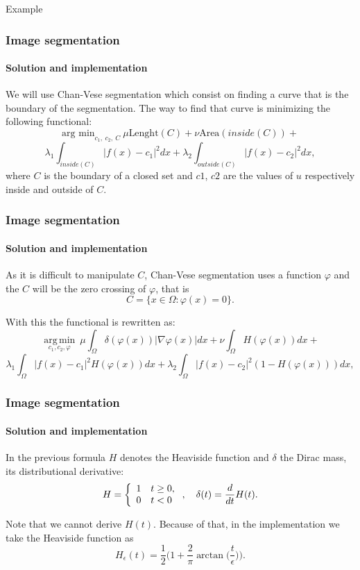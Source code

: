 \documentclass[11pt]{beamer}
\DeclareMathOperator*{\argmin}{\mathrm{arg\, min}}
\begin{document}
\begin{frame}
\begin{exampleblock}{Example}
\begin{figure}
\begin{subfigure}[b]{0.4\textwidth}
    \end{subfigure}

\end{figure}
\end{exampleblock}
\end{frame}

\begin{frame}
\frametitle{Image segmentation}
\framesubtitle{Solution and implementation}

We will use Chan-Vese segmentation which consist on finding a curve that is the boundary of the segmentation. The way to find that curve is minimizing the following functional:
$$\text{arg min}_{c_1,\ c_2,\ C }\ \mu \text{Lenght}(C) +\nu\text{Area}(inside(C)) +$$$$ \lambda_1\int_{inside(C)}|f(x)-c_1|^2dx + \lambda_2\int_{outside(C)}|f(x)-c_2|^2dx,$$
where $C$ is the boundary of a closed set and $c1$, $c2$ are the values of $u$ respectively inside and outside of $C$. 

\end{frame}

\begin{frame}
\frametitle{Image segmentation}
\framesubtitle{Solution and implementation}
\begin{block}{}
As it is difficult to manipulate $C$, Chan-Vese segmentation uses a function $\varphi$ and the $C$ will be the zero crossing of $\varphi$, that is 
$$C = \{x\in \Omega:\varphi(x) = 0\}.$$
\end{block}

With this the functional is rewritten as:
$$\displaystyle\argmin\limits_{c_1, c_2, \varphi}\ \mu \int_{\Omega}\delta(\varphi(x))|\nabla\varphi(x)|dx+\nu \int_{\Omega}H(\varphi(x))dx +$$$$ \lambda_1\int_{\Omega}|f(x)-c_1|^2H(\varphi(x))dx + \lambda_2\int_{\Omega}|f(x) -c_2|^2(1-H(\varphi(x)))dx,$$
\end{frame}

\begin{frame}
\frametitle{Image segmentation}
\framesubtitle{Solution and implementation}
In the previous formula $H$ denotes the Heaviside function and $\delta$ the Dirac mass, its distributional derivative:
$$ H = \left\lbrace\begin{array}{l l}
1&t\geq 0,\\
0 & t<0
\end{array}\right. ,\quad \delta(t) = \frac{d}{dt}H(t).$$

Note that we cannot derive $H(t)$. Because of that, in the implementation we take the Heaviside function as
$$H_{\epsilon}(t) = \frac{1}{2}\bigg(1 + \frac{2}{\pi}\arctan \bigg(\frac{t}{\epsilon}\bigg)\bigg).$$

\end{frame}
\end{document}
